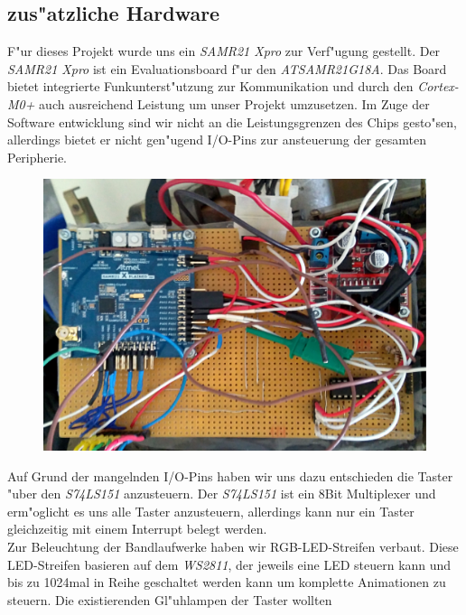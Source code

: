 \documentclass[a4paper]{article}
\begin{document}
  \subsection{zus"atzliche Hardware}
    \label{sec:hardware_additional}
    F"ur dieses Projekt wurde uns ein \textit{SAMR21 Xpro} zur Verf"ugung
    gestellt. Der \textit{SAMR21 Xpro} ist ein Evaluationsboard f"ur den
    \textit{ATSAMR21G18A}. Das Board bietet integrierte Funkunterst"utzung zur
    Kommunikation und durch den \textit{Cortex-M0+} auch ausreichend Leistung um
    unser Projekt umzusetzen. Im Zuge der Software entwicklung sind wir nicht
    an die Leistungsgrenzen des Chips gesto"sen, allerdings bietet er nicht
    gen"ugend I/O-Pins zur ansteuerung der gesamten Peripherie.\\
    \begin{figure}
      \centering
      \label{figure:Hardwareplattform}
      \includegraphics[scale=0.05]{Platine.jpg}
    \end{figure}
    Auf Grund der mangelnden I/O-Pins haben wir uns dazu entschieden die Taster
    "uber den \textit{S74LS151} anzusteuern. Der \textit{S74LS151} ist ein 8Bit
    Multiplexer und erm"oglicht es uns alle Taster anzusteuern, allerdings kann
    nur ein Taster gleichzeitig mit einem Interrupt belegt werden.\\
    Zur Beleuchtung der Bandlaufwerke haben wir RGB-LED-Streifen verbaut. Diese
    LED-Streifen basieren auf dem \textit{WS2811}, der jeweils eine LED steuern
    kann und bis zu 1024mal in Reihe geschaltet werden kann um komplette
    Animationen zu steuern. Die existierenden Gl"uhlampen der Taster wollten
\end{document}
